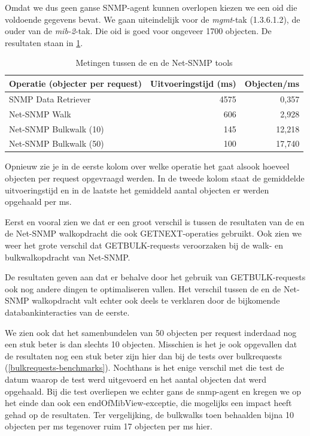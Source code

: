Omdat we dus geen ganse SNMP-agent kunnen overlopen kiezen we een \gls{oid} die voldoende gegevens bevat.
We gaan uiteindelijk voor de \textit{mgmt}-tak (1.3.6.1.2), de ouder van de \textit{mib-2}-tak.
Die \gls{oid} is goed voor ongeveer 1700 objecten.
De resultaten staan in \cref{tabel-nwmretriever-vs-net-snmp}.

\begin{table}[h]
\centering
\begin{tabular}{@{}lrr@{}}
\toprule
Operatie (objecter per request) & Uitvoeringstijd (ms) & Objecten/ms \\ \midrule
SNMP Data Retriever             & 4575                 & 0,357       \\
Net-SNMP Walk                   & 606                  & 2,928       \\
Net-SNMP Bulkwalk (10)          & 145                  & 12,218      \\
Net-SNMP Bulkwalk (50)          & 100                  & 17,740      \\ \bottomrule
\end{tabular}
\caption{Metingen tussen de \nwmretriever{} en de Net-SNMP tools}
\label{tabel-nwmretriever-vs-net-snmp}
\end{table}

Opnieuw zie je in de eerste kolom over welke operatie het gaat alsook hoeveel objecten per request opgevraagd werden.
In de tweede kolom staat de gemiddelde uitvoeringstijd en in de laatste het gemiddeld aantal objecten er werden opgehaald per ms.

Eerst en vooral zien we dat er een groot verschil is tussen de resultaten van de \nwmretriever{}
en de Net-SNMP walkopdracht die ook GETNEXT-operaties gebruikt.
Ook zien we weer het grote verschil dat GETBULK-requests veroorzaken bij de walk- en bulkwalkopdracht van Net-SNMP.

De resultaten geven aan dat er behalve door het gebruik van GETBULK-requests ook nog andere dingen te optimaliseren vallen.
Het verschil tussen de \nwmretriever{} en de Net-SNMP walkopdracht valt echter ook deels te verklaren door de bijkomende databankinteracties van de eerste.

We zien ook dat het samenbundelen van 50 objecten per request inderdaad nog een stuk beter is dan slechts 10 objecten.
Misschien is het je ook opgevallen dat de resultaten nog een stuk beter zijn hier dan bij de tests over bulkrequests (\cref{bulkrequests-benchmarks}).
Nochthans is het enige verschil met die test de datum waarop de test werd uitgevoerd en het aantal objecten dat werd opgehaald.
Bij die test overliepen we echter gans de \gls{snmp-agent} en kregen we op het einde dan ook een endOfMibView-exceptie,
die mogelijks een impact heeft gehad op de resultaten.
Ter vergelijking, de bulkwalks toen behaalden bijna 10 objecten per ms tegenover ruim 17 objecten per ms hier.

